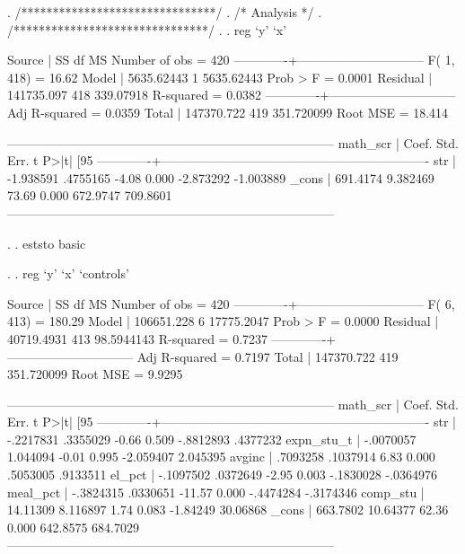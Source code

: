 \documentclass[12pt]{article}
\begin{document}
\begin{stlog}

. /*******************************/  
. /* Analysis */
. /*******************************/    
. 
. reg `y' `x'

      Source |       SS       df       MS              Number of obs =     420
-------------+------------------------------           F(  1,   418) =   16.62
       Model |  5635.62443     1  5635.62443           Prob > F      =  0.0001
    Residual |  141735.097   418   339.07918           R-squared     =  0.0382
-------------+------------------------------           Adj R-squared =  0.0359
       Total |  147370.722   419  351.720099           Root MSE      =  18.414

------------------------------------------------------------------------------
    math_scr |      Coef.   Std. Err.      t    P>|t|     [95%
-------------+----------------------------------------------------------------
         str |  -1.938591   .4755165    -4.08   0.000    -2.873292   -1.003889
       _cons |   691.4174   9.382469    73.69   0.000     672.9747    709.8601
------------------------------------------------------------------------------

. 
. eststo  basic

. 
. reg `y' `x' `controls'

      Source |       SS       df       MS              Number of obs =     420
-------------+------------------------------           F(  6,   413) =  180.29
       Model |  106651.228     6  17775.2047           Prob > F      =  0.0000
    Residual |  40719.4931   413  98.5944143           R-squared     =  0.7237
-------------+------------------------------           Adj R-squared =  0.7197
       Total |  147370.722   419  351.720099           Root MSE      =  9.9295

------------------------------------------------------------------------------
    math_scr |      Coef.   Std. Err.      t    P>|t|     [95%
-------------+----------------------------------------------------------------
         str |  -.2217831   .3355029    -0.66   0.509    -.8812893    .4377232
  expn_stu_t |  -.0070057   1.044094    -0.01   0.995    -2.059407    2.045395
      avginc |   .7093258   .1037914     6.83   0.000     .5053005    .9133511
      el_pct |  -.1097502   .0372649    -2.95   0.003    -.1830028   -.0364976
    meal_pct |  -.3824315   .0330651   -11.57   0.000    -.4474284   -.3174346
    comp_stu |   14.11309   8.116897     1.74   0.083     -1.84249    30.06868
       _cons |   663.7802   10.64377    62.36   0.000     642.8575    684.7029
------------------------------------------------------------------------------




\end{stlog}
\end{document}
